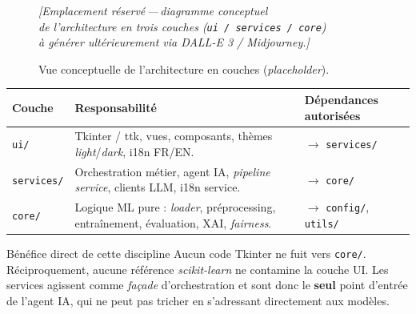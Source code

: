 \documentclass[11pt,a4paper]{report}
\begin{document}
\begin{figure}[H]
    \centering
    \begin{tcolorbox}[
        colback=light, colframe=rule, boxrule=0.6pt,
        width=0.85\linewidth, arc=4pt,
        left=20pt, right=20pt, top=24pt, bottom=24pt
    ]
    \centering
    {\sffamily\color{muted}\itshape
    [Emplacement r\'eserv\'e\,---\,diagramme conceptuel\\
    de l'architecture en trois couches (\texttt{ui / services / core})\\
    \`a g\'en\'erer ult\'erieurement via DALL-E 3 / Midjourney.]}
    \end{tcolorbox}
    \caption{Vue conceptuelle de l'architecture en couches (\textit{placeholder}).}
    \label{fig:layered-arch}
\end{figure}

\begin{center}
\begin{tabular}{!{\color{accent}\vrule width 2pt}L{2.6cm} L{5cm} L{6.5cm}}
\toprule
\textbf{Couche} & \textbf{Responsabilit\'e} & \textbf{D\'ependances autoris\'ees} \\
\midrule
\texttt{ui/}        & Tkinter / ttk, vues, composants, th\`emes \textit{light}/\textit{dark}, i18n FR/EN. & $\rightarrow$ \texttt{services/}                  \\
\texttt{services/}  & Orchestration m\'etier, agent IA, \textit{pipeline service}, clients LLM, i18n service.    & $\rightarrow$ \texttt{core/}                      \\
\texttt{core/}      & Logique ML pure : \textit{loader}, pr\'eprocessing, entra\^inement, \'evaluation, XAI, \textit{fairness}. & $\rightarrow$ \texttt{config/}, \texttt{utils/} \\
\bottomrule
\end{tabular}
\end{center}

\begin{techbox}{B\'en\'efice direct de cette discipline}
Aucun code Tkinter ne fuit vers \texttt{core/}. R\'eciproquement,
aucune r\'ef\'erence \textit{scikit-learn} ne contamine la couche
UI. Les services agissent comme \textit{façade} d'orchestration et
sont donc le \textbf{seul} point d'entr\'ee de l'agent IA, qui ne
peut pas \og tricher \fg{} en s'adressant directement aux mod\`eles.
\end{techbox}
\end{document}
